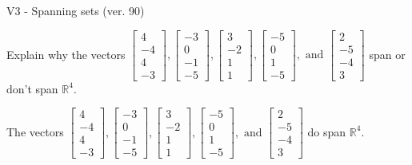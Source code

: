\begin{exercise}
  \begin{exerciseTitle}V3 - Spanning sets (ver. 90)\end{exerciseTitle}
  \begin{exerciseStatement}
    Explain why the vectors \(\left[\begin{array}{r}
4 \\
-4 \\
4 \\
-3
\end{array}\right] , \left[\begin{array}{r}
-3 \\
0 \\
-1 \\
-5
\end{array}\right] , \left[\begin{array}{r}
3 \\
-2 \\
1 \\
1
\end{array}\right] , \left[\begin{array}{r}
-5 \\
0 \\
1 \\
-5
\end{array}\right] , \text{ and } \left[\begin{array}{r}
2 \\
-5 \\
-4 \\
3
\end{array}\right]\) span or don't span \(\mathbb{R}^4\). 
	


  \end{exerciseStatement}
  \begin{exerciseAnswer}
   The vectors \(\left[\begin{array}{r}
4 \\
-4 \\
4 \\
-3
\end{array}\right] , \left[\begin{array}{r}
-3 \\
0 \\
-1 \\
-5
\end{array}\right] , \left[\begin{array}{r}
3 \\
-2 \\
1 \\
1
\end{array}\right] , \left[\begin{array}{r}
-5 \\
0 \\
1 \\
-5
\end{array}\right] , \text{ and } \left[\begin{array}{r}
2 \\
-5 \\
-4 \\
3
\end{array}\right]\) 
  	 do  
	span \(\mathbb{R}^4\).
  



\end{exerciseAnswer}
\end{exercise}
